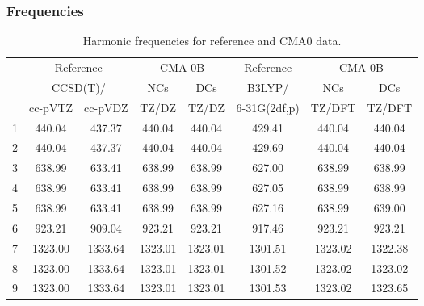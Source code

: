 \documentclass[10pt,oneside]{article}
\begin{document}
\subsubsection*{Frequencies}
\begin{table}[h!]
\centering
\caption{Harmonic frequencies for reference and CMA0 data.}
\begin{tabular}{cccccccc}
\toprule
{} & \multicolumn{2}{c}{Reference} & \multicolumn{2}{c}{CMA-0B} &    Reference & \multicolumn{2}{c}{CMA-0B} \\
{} & \multicolumn{2}{c}{CCSD(T)/} &     NCs &     DCs &       B3LYP/ &     NCs &     DCs \\
{} &   cc-pVTZ & cc-pVDZ &   TZ/DZ &   TZ/DZ & 6-31G(2df,p) &  TZ/DFT &  TZ/DFT \\
\midrule
1 &    440.04 &  437.37 &  440.04 &  440.04 &       429.41 &  440.04 &  440.04 \\
2 &    440.04 &  437.37 &  440.04 &  440.04 &       429.69 &  440.04 &  440.04 \\
3 &    638.99 &  633.41 &  638.99 &  638.99 &       627.00 &  638.99 &  638.99 \\
4 &    638.99 &  633.41 &  638.99 &  638.99 &       627.05 &  638.99 &  638.99 \\
5 &    638.99 &  633.41 &  638.99 &  638.99 &       627.16 &  638.99 &  639.00 \\
6 &    923.21 &  909.04 &  923.21 &  923.21 &       917.46 &  923.21 &  923.21 \\
7 &   1323.00 & 1333.64 & 1323.01 & 1323.01 &      1301.51 & 1323.02 & 1322.38 \\
8 &   1323.00 & 1333.64 & 1323.01 & 1323.01 &      1301.52 & 1323.02 & 1323.02 \\
9 &   1323.00 & 1333.64 & 1323.01 & 1323.01 &      1301.53 & 1323.02 & 1323.65 \\
\bottomrule
\end{tabular}
\end{table}

\clearpage
\end{document}
